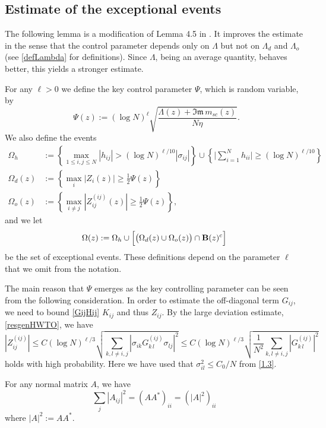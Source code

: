 \documentclass[draft]{article}
\newcommand{\non}{\nonumber}
\newcommand{\be}{\begin{equation}}
\newcommand{\ee}{\end{equation}}
\newcommand{\im}{{\mathfrak{Im} \, }}
\numberwithin{equation}{section}
\numberwithin{theorem}{section}
\numberwithin{definition}{section}
\numberwithin{remark}{section}
\begin{document}
\subsection{Estimate of the exceptional events}\label{sec:excep}

The following lemma is a modification of Lemma 4.5 in \cite{EYY2}. It improves the 
estimate in the sense that 
 the control parameter  depends only on $\Lambda$ but not on
$\Lambda_d$ and $\Lambda_o$ (see \eqref{defLambda} for definitions). Since $\Lambda$, being an
average quantity, behaves better, this  yields
a stronger estimate.  

For any $\ell>0$ we
define the  key control parameter $\Psi$,  which is  random variable, by
\be\label{1.9}
\,\,\, \Psi(z):= (\log N)^\ell  \sqrt{\frac{\Lambda(z)+\im m_{sc}(z) }{N\eta}}.
\ee
We also define the  events 
\begin{align} \label{eq:excep}
\Omega_h &:= \left \{  \max_{1\leq i,j\leq N}|h_{ij}|>
(\log N)^{\ell/10} |\sigma_{ij}| \right \} \cup \left\{ \Big| \sum_{i=1}^N h_{ii}\Big|\ge (\log N)^{\ell/10}\right\}
     \\
\Omega_d(z) &:= \left \{   \max_{i}|Z_i(z)|\ge  \frac{1}{2}\Psi (z)\right \} 
 \non \\
\Omega_o(z) &:= \left \{    \max_{i\ne j}|Z_{ij}^{(ij)}(z)| \ge 
\frac{1}{2} \Psi (z)\right \}, \non  
\end{align}
and we let 
\be
  \Omega (z):= 
\Omega_h \cup \Big[\big( \Omega_d(z) \cup \Omega_o(z) \big)\cap {\bf B}(z)^c \Big]
\label{defOmega}
\ee 
 be the set of  exceptional events. 
These definitions depend on the parameter $\ell$ that we omit from the notation.

 The main reason that $\Psi$ emerges as the key controlling parameter can be seen from the following 
consideration.  In order to estimate  the off-diagonal term $G_{ij}$,   
we need to bound \eqref{GijHij} $K_{ij}$ and thus $Z_{ij}$. 
By the large deviation estimate,  \eqref{resgenHWTO}, we have 
\be\label{z1}
|Z_{ij}^{(ij)}|
 \leq   C(\log N)^{\ell/3}  \sqrt{\sum_{k,l\not= i, j }\left|\sigma_{ik}
G^{(ij)}_{k\,l}\sigma_{lj}\right|^2} \le C(\log N)^{\ell/3}  \sqrt{   \frac  1 { N^2} \sum_{k,l\not= i, j }  \left| 
G^{(ij)}_{k\,l}   \right|^2}
\ee
holds with  high probability.  Here we have used that 
$\sigma_{il}^2 \le C_0/ N$ from \eqref{1.3}.


For any   normal matrix $A$, we have 
\be\label{wid1}
\sum_{j} |A_{ij}|^2 =  (A A^*)_{ii} =  (|A|^2)_{ii} 
\ee
where $|A|^2:= A A^*$. 
\end{document}
